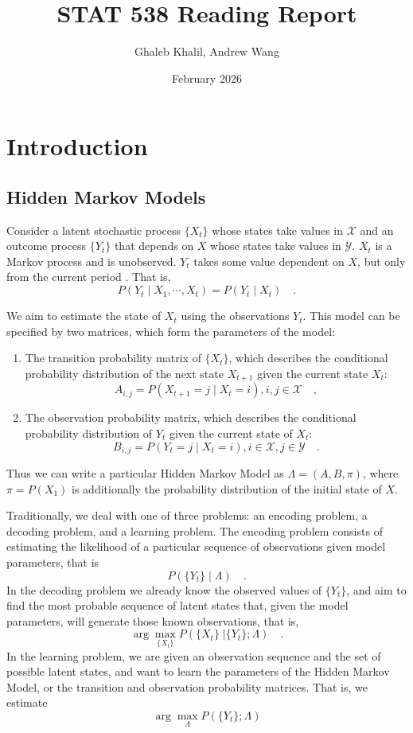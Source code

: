 \documentclass{article}
\title{STAT 538 Reading Report}
\author{Ghaleb Khalil, Andrew Wang}
\date{February 2026}
\begin{document}
\maketitle

\section{Introduction}



\subsection{Hidden Markov Models}


Consider a latent stochastic process $\{X_t\}$ whose states take values in $\mathcal{X}$ and an outcome process $\{Y_t\}$ that depends on $X$ whose states take values in $\mathcal{Y}$. $X_t$ is a Markov process and is unobserved. $Y_t$ takes some value dependent on $X$, but only from the current period \cite{rabiner1989}. That is,
\[
P(Y_t \; | \; X_1, \cdots, X_t) = P(Y_t \; | \; X_t) \quad.
\]

We aim to estimate the state of $X_t$ using the observations $Y_t$. This model can be specified by two matrices, which form the parameters of the model:

\begin{enumerate}
    \item The transition probability matrix of $\{X_t\}$, which describes the conditional probability distribution of the next state $X_{t+1}$ given the current state $X_t$:
    \[
    A_{i,j} = P(X_{t+1} = j \; | \; X_t = i), i,j \in \mathcal{X} \quad,
    \]
    \item  The observation probability matrix, which describes the conditional probability distribution of $Y_t$ given the current state of $X_t$:
    \[
    B_{i,j} = P(Y_t = j \; | \; X_t = i), i \in \mathcal{X}, j \in \mathcal{Y} \quad.
    \]
\end{enumerate}

Thus we can write a particular Hidden Markov Model as $\Lambda = (A, B, \pi)$, where $\pi = P(X_1)$ is additionally the probability distribution of the initial state of $X$.

Traditionally, we deal with one of three problems: an encoding problem, a decoding problem, and a learning problem. The encoding problem consists of estimating the likelihood of a particular sequence of observations given model parameters, that is 
\[
P(\{Y_t\} \; | \; \Lambda) \quad.
\]
In the decoding problem we already know the observed values of $\{Y_t\}$, and aim to find the most probable sequence of latent states that, given the model parameters, will generate those known observations, that is,
\[
\arg \max_{\{X_t\}} P(\{X_t\} \; | \{Y_t\}; \Lambda) \quad.
\]
In the learning problem, we are given an observation sequence and the set of possible latent states, and want to learn the parameters of the Hidden Markov Model, or the transition and observation probability matrices. That is, we estimate
\[
\arg \max_{\Lambda} P(\{ Y_t \} ; \Lambda)
\]
\end{document}
